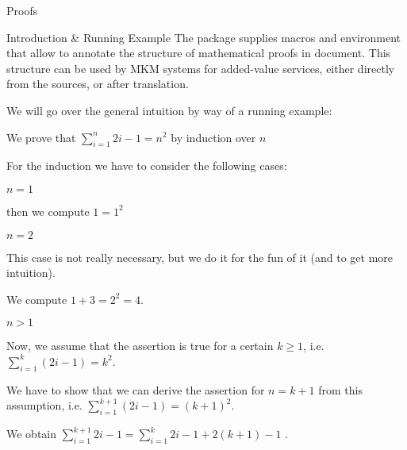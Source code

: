 \begin{sfragment}{Proofs}

\begin{sfragment}{Introduction \& Running Example}
  The  package supplies macros and environment that allow to annotate the
  structure of mathematical proofs in \sTeX document. This structure can be used by MKM
  systems for added-value services, either directly from the \sTeX sources, or after
  translation.

  We will go over the general intuition by way of a running example: 

\begin{latexcode}
\begin{sproof}[id=simple-proof]
   {We prove that $\sum_{i=1}^n{2i-1}=n^{2}$ by induction over $n$}
  \begin{spfcases}{For the induction we have to consider the following cases:}
   \begin{spfcase}{$n=1$}
    \begin{spfstep}[type=inline] then we compute $1=1^2$\end{spfstep}
   \end{spfcase}
   \begin{spfcase}{$n=2$}
      \begin{spfcomment}[type=inline]
        This case is not really necessary, but we do it for the
        fun of it (and to get more intuition).
      \end{spfcomment}
      \begin{spfstep}[type=inline] We compute $1+3=2^{2}=4$.\end{spfstep}
   \end{spfcase}
   \begin{spfcase}{$n>1$}
      \begin{spfstep}[type=assumption,id=ind-hyp]
        Now, we assume that the assertion is true for a certain $k\geq 1$,
        i.e. $\sum_{i=1}^k{(2i-1)}=k^{2}$.
      \end{spfstep}
      \begin{spfcomment}
        We have to show that we can derive the assertion for $n=k+1$ from
        this assumption, i.e. $\sum_{i=1}^{k+1}{(2i-1)}=(k+1)^{2}$.
      \end{spfcomment}
      \begin{spfstep}
        We obtain $\sum_{i=1}^{k+1}{2i-1}=\sum_{i=1}^k{2i-1}+2(k+1)-1$
        .
      \end{spfstep}

\end{spfcase}
\end{spfcases}
\end{sproof}
\end{latexcode}
\end{sfragment}
\end{sfragment}
